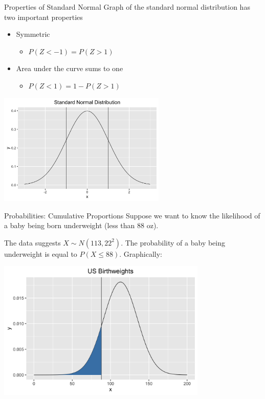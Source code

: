 \documentclass{beamer}
\begin{document}
\begin{frame}{Properties of Standard Normal}
	Graph of the standard normal distribution has two important properties
	
	\begin{itemize}
		\item Symmetric
			\begin{itemize}
		      	\item $P(Z < -1) = P(Z > 1)$
			\end{itemize}
		\item Area under the curve sums to one
			\begin{itemize}
		      	\item $P(Z < 1)= 1 - P(Z > 1)$
			\end{itemize}
    \end{itemize}
    \begin{center}
        \includegraphics[width=0.6\textwidth]{stdnormal}
    \end{center}
\end{frame}

\begin{frame}{Probabilities: Cumulative Proportions}
	Suppose we want to know the likelihood of a baby being born underweight (less than 88 oz). 
	
	The data suggests $X \sim N(113,22^2).$ The probability of a baby being underweight is equal to $P(X \leq 88)$. Graphically:

	\begin{center}
		\includegraphics[width=0.75\textwidth]{normal_prob}
	\end{center}
\end{frame}
\end{document}
